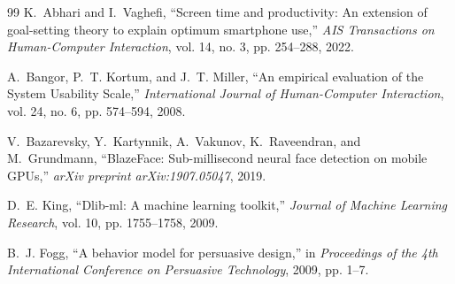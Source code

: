 \documentclass[conference]{IEEEtran}
\begin{document}
\begin{thebibliography}{99}
K.~Abhari and I.~Vaghefi, ``Screen time and productivity: An extension of goal-setting theory to explain optimum smartphone use,'' \emph{AIS Transactions on Human-Computer Interaction}, vol. 14, no. 3, pp. 254--288, 2022.

A.~Bangor, P.~T. Kortum, and J.~T. Miller, ``An empirical evaluation of the System Usability Scale,'' \emph{International Journal of Human-Computer Interaction}, vol. 24, no. 6, pp. 574--594, 2008.

V.~Bazarevsky, Y.~Kartynnik, A.~Vakunov, K.~Raveendran, and M.~Grundmann, ``BlazeFace: Sub-millisecond neural face detection on mobile GPUs,'' \emph{arXiv preprint arXiv:1907.05047}, 2019.

D.~E. King, ``Dlib-ml: A machine learning toolkit,'' \emph{Journal of Machine Learning Research}, vol. 10, pp. 1755--1758, 2009.

B.~J. Fogg, ``A behavior model for persuasive design,'' in \emph{Proceedings of the 4th International Conference on Persuasive Technology}, 2009, pp. 1--7.

\end{thebibliography}
\end{document}
